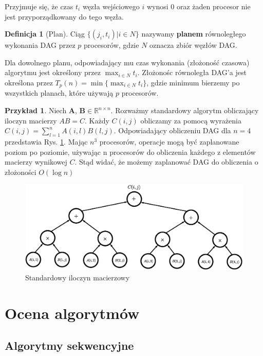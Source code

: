 \documentclass[a4paper,oneside,leqno,12pt]{book}
\theoremstyle{definition}
\newtheorem{przyklad}{Przykład}[chapter]
\newtheorem{definicja}{Definicja}[chapter]
\theoremstyle{plain}
\theoremstyle{remark}
\begin{document}
Przyjmuje się, że czas \(t_i\) węzła wejściowego \(i\) wynosi 0 oraz żaden procesor nie jest przyporządkowany do tego węzła.\\
\begin{definicja}[Plan]\label{def:plan}
Ciąg \(\{(j_i, t_i) | i\in N\}\) nazywamy \textbf{planem} równoległego wykonania DAG przez \(p\) procesorów, gdzie \(N\) oznacza zbiór węzłów DAG.
\end{definicja}
Dla dowolnego planu, odpowiadający mu czas wykonania (złożoność czasowa) algorytmu jest określony przez \(\max_{i\in N}t_i\). Złożonośc równoległa DAG'a jest określona przez \(T_{p}(n) = \min{\{\max_{i\in N}t_i\}}\), gdzie minimum bierzemy po wszystkich planach, które używają \(p\) procesorów.


\begin{przyklad}
Niech \(\mathbf{A}\), \(\mathbf{B}\in\mathbb{R}^{n\times n}\). Rozważmy standardowy algorytm obliczający iloczyn macierzy \(AB = C\). Każdy \(C(i, j)\) obliczamy za pomocą wyrażenia \(C(i, j)=\sum_{l=1}^{n}A(i,l)B(l,j)\). Odpowiadający obliczeniu DAG dla \(n=4\) przedstawia Rys. \ref{fig:standard_parallel}. Mając \(n^3\) procesorów, operacje mogą być zaplanowane poziom po poziomie, używając n procesorów do obliczenia każdego z elementów macierzy wynikowej \(C\). Stąd widać, że możemy zaplanować DAG do obliczenia o złożoności \(O(\log{n})\)
\begin{figure}[H]
\centering
\includegraphics[width=36em]{./images/Rys3.eps}
\caption{Standardowy iloczyn macierzowy}
\label{fig:standard_parallel}
\end{figure}

\end{przyklad}

\section{Ocena algorytmów}
\label{subsec:algorytmy_sekwencyjne}
\subsection{Algorytmy sekwencyjne}
\end{document}
